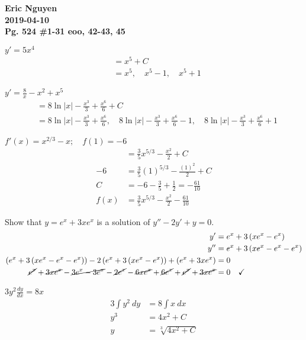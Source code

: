 \documentclass[12pt]{article}
\newenvironment{problem}[2][]{
    \begin{trivlist}
        \item[
            {\bfseries #1}
            {\bfseries #2.}
        ]
}{\end{trivlist}}
\newcommand{\assignment}{Pg. 524 \#1-31 eoo, 42-43, 45}
\newcommand{\name}{Eric Nguyen}
\newcommand{\duedate}{2019-04-10}
\newcommand{\details}{\noindent\textbf{\name \\\duedate \\\assignment}}
\begin{document}
\details

\begin{problem}{1}
$y' = 5x^4$
\begin{align}
&= x^5 + C \\
&= x^5,
\quad x^5 - 1,
\quad x^5 + 1
\end{align}
\end{problem}

\begin{problem}{5}
$y' = \frac{8}{x} - x^2 + x^5$
\begin{align}
&= 8 \ln |x| - \frac{x^3}{3} + \frac{x^6}{6} + C \\
&= 8 \ln |x| - \frac{x^3}{3} + \frac{x^6}{6},
\quad 8 \ln |x| - \frac{x^3}{3} + \frac{x^6}{6} - 1,
\quad 8 \ln |x| - \frac{x^3}{3} + \frac{x^6}{6} + 1
\end{align}
\end{problem}

\begin{problem}{9}
$f'(x) = x^{2/3} - x; \quad f(1) = -6$
\begin{align}
&= \frac{3}{5} x^{5/3} - \frac{x^2}{2} + C \\
-6 &= \frac{3}{5} \left(1\right)^{5/3} - \frac{(1)^2}{2} + C \\
C &= -6 - \frac{3}{5} + \frac{1}{2} = -\frac{61}{10} \\
f(x) &= \frac{3}{5} x^{5/3} - \frac{x^2}{2} - \frac{61}{10}
\end{align}
\end{problem}

\begin{problem}{13}
Show that $y = e^x + 3x e^x$ is a solution of $y'' - 2y' + y = 0$.
\begin{align}
y' &= e^x + 3\left(xe^x - e^x\right) \\
y'' &= e^x + 3\left(xe^x - e^x - e^x\right) \\
\left(e^x + 3\left(xe^x - e^x - e^x\right)\right) - 2\left(e^x + 3\left(xe^x - e^x\right)\right) + \left(e^x + 3x e^x\right) &= 0 \\
\cancel{e^x} + \cancel{3xe^x} - \cancel{3e^x - 3e^x} - \cancel{2e^x} - \cancel{6xe^x} + \cancel{6e^x} + \cancel{e^x} + \cancel{3xe^x} &= 0 \quad \checkmark
\end{align}
\end{problem}

\begin{problem}{17}
$3y^2 \frac{dy}{dx} = 8x$
\begin{align}
3 \int y^2 ~ dy &= 8 \int x ~ dx \\
y^3 &= 4x^2 + C \\
y &= \sqrt[3]{4x^2 + C}
\end{align}
\end{problem}
\end{document}
